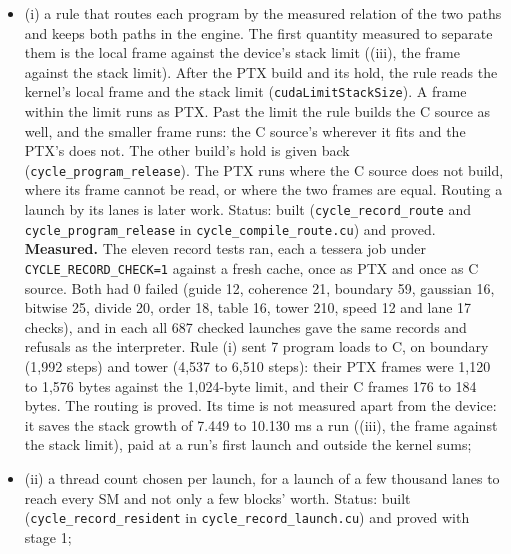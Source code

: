 \begin{enumerate}
\begin{itemize}
\begin{enumerate}
\begin{itemize}
\item (i) a rule that routes each program by the measured relation of the two paths and keeps both paths in the engine. The first quantity measured to separate them is the local frame against the device's stack limit ((iii), the frame against the stack limit). After the PTX build and its hold, the rule reads the kernel's local frame and the stack limit (\texttt{cuda\allowbreak{}Limit\allowbreak{}Stack\allowbreak{}Size}). A frame within the limit runs as PTX. Past the limit the rule builds the C source as well, and the smaller frame runs: the C source's wherever it fits and the PTX's does not. The other build's hold is given back (\texttt{cycle\_\allowbreak{}program\_\allowbreak{}release}). The PTX runs where the C source does not build, where its frame cannot be read, or where the two frames are equal. Routing a launch by its lanes is later work. Status: built (\texttt{cycle\_\allowbreak{}record\_\allowbreak{}route} and \texttt{cycle\_\allowbreak{}program\_\allowbreak{}release} in \texttt{cycle\_\allowbreak{}compile\_\allowbreak{}route.\allowbreak{}cu}) and proved. \textbf{Measured.} The eleven record tests ran, each a tessera job under \texttt{CYCLE\_\allowbreak{}RECORD\_\allowbreak{}CHECK=1} against a fresh cache, once as PTX and once as C source. Both had 0 failed (guide 12, coherence 21, boundary 59, gaussian 16, bitwise 25, divide 20, order 18, table 16, tower 210, speed 12 and lane 17 checks), and in each all 687 checked launches gave the same records and refusals as the interpreter. Rule (i) sent 7 program loads to C, on boundary (1,992 steps) and tower (4,537 to 6,510 steps): their PTX frames were 1,120 to 1,576 bytes against the 1,024-byte limit, and their C frames 176 to 184 bytes. The routing is proved. Its time is not measured apart from the device: it saves the stack growth of 7.449 to 10.130 ms a run ((iii), the frame against the stack limit), paid at a run's first launch and outside the kernel sums;
\item (ii) a thread count chosen per launch, for a launch of a few thousand lanes to reach every SM and not only a few blocks' worth. Status: built (\texttt{cycle\_\allowbreak{}record\_\allowbreak{}resident} in \texttt{cycle\_\allowbreak{}record\_\allowbreak{}launch.\allowbreak{}cu}) and proved with stage 1;


\end{itemize}
\end{enumerate}
\end{itemize}
\end{enumerate}
